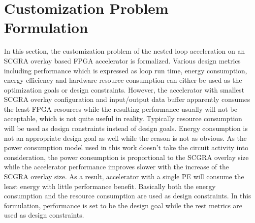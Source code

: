 \section{Customization Problem Formulation}
In this section, the customization problem of the nested loop acceleration on an SCGRA overlay based FPGA accelerator is formalized. Various design metrics including performance which is expressed as loop run time, energy consumption, energy efficiency and hardware resource consumption can either be used as the optimization goals or design constraints. However, the accelerator with smallest SCGRA overlay configuration and input/output data buffer apparently consumes the least FPGA resources while the resulting performance usually will not be acceptable, which is not quite useful in reality. Typically resource consumption will be used as design constraints instead of design goals. Energy consumption is not an appropriate design goal as well while the reason is not as obvious. As the power consumption model used in this work doesn't take the circuit activity into consideration, the power consumption is proportional to the SCGRA overlay size while the accelerator performance improves slower with the increase of the SCGRA overlay size. As a result, accelerator with a single PE will consume the least energy with little performance benefit. Basically both the energy consumption and the resource consumption are used as design constraints. In this formulation, performance is set to be the design goal while the rest metrics are used as design constraints. 


